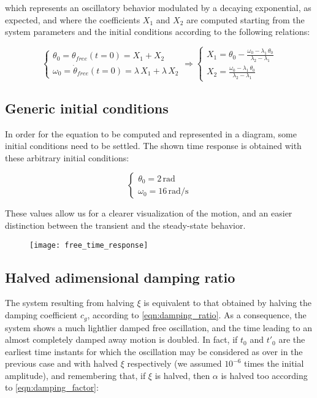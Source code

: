 \documentclass[a4paper,12pt,oneside]{article}
\begin{document}
which represents an oscillatory behavior modulated by a decaying exponential, as expected, and where the coefficients $ X_1 $ and $ X_2 $ are computed starting from the system parameters and the initial conditions according to the following relations:

\[ \begin{cases}
	\theta_0 = \theta_{free}(t = 0) = X_1 + X_2 \\
	\omega_0 = \dot{\theta}_{free}(t = 0) = \lambda \, X_1 + \lambda \, X_2
\end{cases}
\Rightarrow \begin{cases}
	X_1 = \theta_0 - \frac{\omega_0 - \lambda_1 \, \theta_0} %
		{\lambda_2 - \lambda_1} \\
	X_2 = \frac{\omega_0 - \lambda_1 \, \theta_0} %
		{\lambda_2 - \lambda_1}
\end{cases} \]

\subsection{Generic initial conditions}
\label{subs:generic_initial_conditions}

In order for the equation to be computed and represented in a diagram, some initial conditions need to be settled. The shown time response is obtained with these arbitrary initial conditions:

\[ \begin{cases}
	\theta_0 = 2 \, \text{rad} \\
	\omega_0 = 16 \, \text{rad/s}
\end{cases} \]

These values allow us for a clearer visualization of the motion, and an easier distinction between the transient and the steady-state behavior.

\vspace{16pt}

\begin{figure}[h]
	\centering
	\texttt{[image: free\_time\_response]}
\end{figure}

\subsection{Halved adimensional damping ratio}

The system resulting from halving $ \xi $ is equivalent to that obtained by halving the damping coefficient $ c_g $, according to \eqref{eqn:damping_ratio}. As a consequence, the system shows a much lightlier damped free oscillation, and the time leading to an almost completely damped away motion is doubled. In fact, if $ t_0 $ and $ t'_0 $ are the earliest time instants for which the oscillation may be considered as over in the previous case and with halved $ \xi $ respectively (we assumed $ 10^{-6} $ times the initial amplitude), and remembering that, if $ \xi $ is halved, then $ \alpha $ is halved too according to \eqref{eqn:damping_factor}:
\end{document}
